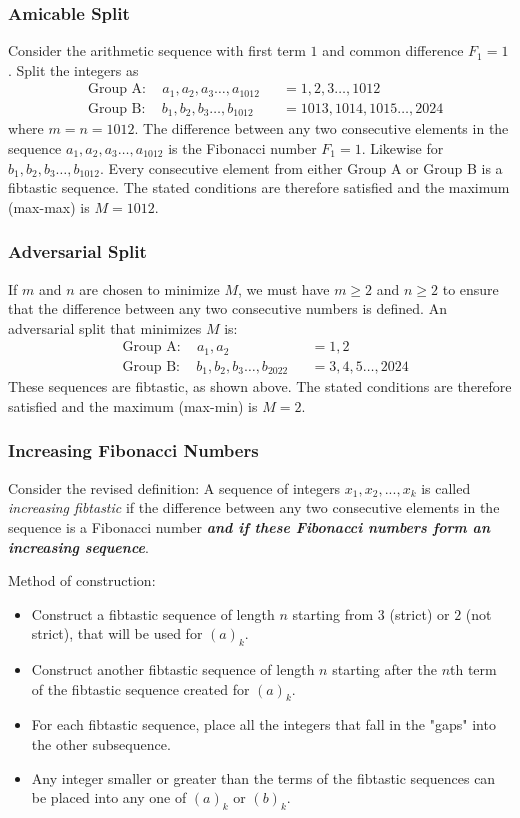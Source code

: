 \subsubsection*{Amicable Split}

Consider the arithmetic sequence with first term $1$ and common difference $F_{1}=1$. Split the integers as
\begin{align*}
& \text{Group A}: 
\quad
a_{1},a_{2},a_{3}\ldots,a_{1012}
&& = 1,2,3\ldots,1012
\\
& \text{Group B}: 
\quad
b_{1},b_{2},b_{3}\ldots,b_{1012}
&& = 1013,1014,1015\ldots,2024
\end{align*}
where $m=n=1012$.
The difference between any two consecutive elements in the sequence $a_{1},a_{2},a_{3}\ldots,a_{1012}$ is the Fibonacci number $F_{1}=1$. Likewise for $b_{1},b_{2},b_{3}\ldots,b_{1012}$. Every consecutive element from either Group A or Group B is a fibtastic sequence. The stated conditions are therefore satisfied and the maximum (max-max) is $M=1012$.

\subsubsection*{Adversarial Split}
If $m$ and $n$ are chosen to minimize $M$, we must have $m\ge2$ and $n\ge2$ to ensure that the difference between any two consecutive numbers is defined. An adversarial split that minimizes $M$ is:
\begin{align*}
& \text{Group A}: 
\quad
a_{1}, a_{2}
&& = 1, 2
\\
& \text{Group B}: 
\quad
b_{1},b_{2},b_{3}\ldots,b_{2022}
&& = 3,4,5\ldots,2024
\end{align*}
These sequences are fibtastic, as shown above. The stated conditions are therefore satisfied and the maximum (max-min) is $M=2$. 

\subsubsection*{Increasing Fibonacci Numbers}
Consider the revised definition:
A sequence of integers $x_{1},x_{2},...,x_{k}$ is called \textit{increasing fibtastic} if the difference between any two consecutive elements in the sequence is a Fibonacci number \textbf{\textit{and if these Fibonacci numbers form an increasing sequence}}. 

Method of construction:
\begin{itemize}
\item Construct a fibtastic sequence of length $n$ starting from $3$ (strict) or $2$ (not strict), that will be used for $(a)_{k}$.
\item Construct another fibtastic sequence of length $n$ starting after the $n$th term of the fibtastic sequence created for $(a)_{k}$.
\item For each fibtastic sequence, place all the integers that fall in the "gaps" into the other subsequence. 
\item Any integer smaller or greater than the terms of the fibtastic sequences can be placed into any one of $(a)_{k}$ or $(b)_{k}$.
\end{itemize}

